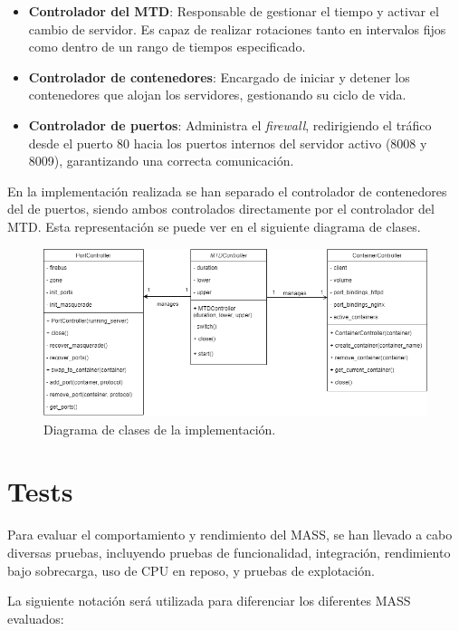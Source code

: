 \begin{itemize}
    \item \textbf{Controlador del MTD}: Responsable de gestionar el tiempo y activar el cambio de servidor. Es capaz de realizar rotaciones tanto en intervalos fijos como dentro de un rango de tiempos especificado.
    \item \textbf{Controlador de contenedores}: Encargado de iniciar y detener los contenedores que alojan los servidores, gestionando su ciclo de vida.
    \item \textbf{Controlador de puertos}: Administra el \textit{firewall}, redirigiendo el tráfico desde el puerto 80 hacia los puertos internos del servidor activo (8008 y 8009), garantizando una correcta comunicación.
\end{itemize}

En la implementación realizada se han separado el controlador de contenedores del de puertos, siendo ambos controlados directamente por el controlador del MTD. Esta representación se puede ver en el siguiente diagrama de clases.

\begin{figure}[H]
    \centering
    \includegraphics[width=\linewidth]{./imagenes/clases.png}
    \caption{Diagrama de clases de la implementación.}
\end{figure}

\section{Tests}
Para evaluar el comportamiento y rendimiento del MASS, se han llevado a cabo diversas pruebas, incluyendo pruebas de funcionalidad, integración, rendimiento bajo sobrecarga, uso de CPU en reposo, y pruebas de explotación.

La siguiente notación será utilizada para diferenciar los diferentes MASS evaluados:

